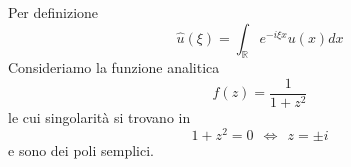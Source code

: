 Per definizione
\begin{equation*}
\hat{u}( \xi ) =\int _{\mathbb{R}} e^{-i\xi x} u( x) dx
\end{equation*}
Consideriamo la funzione analitica
\begin{equation*}
f( z) =\frac{1}{1+z^{2}}
\end{equation*}
le cui singolarità si trovano in
\begin{equation*}
1+z^{2} =0\ \ \iff \ \ z=\pm i
\end{equation*}
e sono dei poli semplici.


\begin{figure}[htpb]
	\centering
{} %

\begin{tikzpicture}[x=0.75pt,y=0.75pt,yscale=-1,xscale=1]


\end{tikzpicture}
\end{figure}
